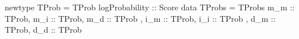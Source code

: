 newtype TProb = TProb { logProbability :: Score }
data TProbs = TProbs
  { m_m :: TProb, m_i :: TProb, m_d :: TProb
  , i_m :: TProb, i_i :: TProb
  , d_m :: TProb, d_d :: TProb }
